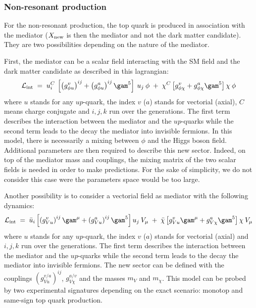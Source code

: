 

\subsubsection{Non-resonant production}
\label{sec:NonResonantProd}

For the non-resonant production, the top quark is produced in association with the mediator 
($X_{\mathrm{new}}$ is then the mediator and not the dark matter candidate). They are two possibilities 
depending on the nature of the mediator.

First, the mediator can be a scalar field interacting with the SM field and the dark matter candidate as described in this lagrangian:
\begin{equation}
 \label{eq:lagrangianNonResonantScalar}
 \Lagr_{\mathrm{int}} \; = \; u^{C}_{i} \:  \left[ \left(g^{v}_{\phi u}\right)^{ij} +  \left(g^{a}_{\phi u}\right)^{ij}  \gam^{5} \right] \: u_{j} \: \phi \; 
 + \; \chi^{C}  \left[ g^{v}_{\phi\chi} + g^{a}_{\phi\chi}  \gam^{5} \right] \chi \: \phi
\end{equation}
where $u$ stands for any $up$-quark, the index $v$ ($a$) stands for vectorial (axial), $C$ means charge conjugate and $i,j,k$ run over the generations.
The first term describes the interaction between the mediator and the $up$-quarks while the second term leads to the decay the mediator 
into invisible fermions. In this model, there is necessarily a mixing between $\phi$ and  the Higgs boson field. Additional parameters 
are then required to describe this new sector. Indeed, on top of the mediator mass and couplings, the mixing matrix of the two scalar fields
is needed in order to make predictions. For the sake of simplicity, we do not consider this case were the parameters 
space would be too large.

Another possibility is to consider a vectorial field as mediator with the following dynamics:
\begin{equation}
 \label{eq:lagrangianNonResonantVector}
  \Lagr_{\mathrm{int}} \; = \; \bar{u}_{i} \left[ \left(g^{v}_{Vu}\right)^{ij} \gam^{\mu} + \left(g^{a}_{Vu}\right)^{ij} \gam^{5} \right] u_{j} \: V_{\mu} \; 
  + \; \bar{\chi} \left[ g^{v}_{Vu} \gam^{\mu} + g^{a}_{V\chi} \gam^{5} \right]   \chi \: V_{\mu}
\end{equation}
where $u$ stands for any $up$-quark, the index $v$ ($a$) stands for vectorial (axial) and $i,j,k$ run over the generations.
The first term describes the interaction between the mediator and the $up$-quarks while the second term leads to the decay the mediator 
into invisible fermions. The new sector can be defined with the couplings $\left(g^{v/a}_{Vu}\right)^{ij}$, 
$g^{a/v}_{V\chi}$ and the masses $m_V$ and $m_{\chi}$. This model can be probed by two experimental signatures 
depending on the exact scenario: monotop and same-sign top quark production. 


